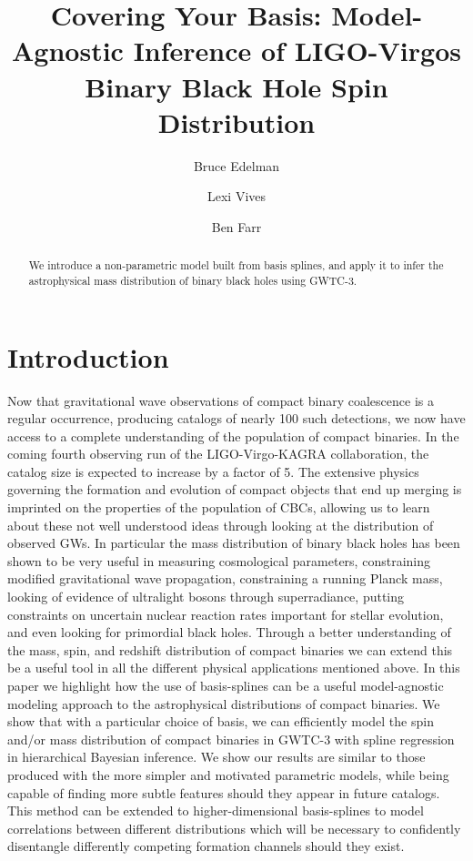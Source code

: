 \documentclass[twocolumn, linenumber]{aastex63}
\begin{document}
\title{Covering Your Basis: Model-Agnostic Inference of LIGO-Virgos Binary Black Hole Spin Distribution}

\author{Bruce Edelman}

\author{Lexi Vives}

\author{Ben Farr}

\begin{abstract}
We introduce a non-parametric model built from basis splines, and apply it to infer the astrophysical mass distribution of 
binary black holes using GWTC-3.
\end{abstract}


\section{Introduction} \label{sec:intro}

Now that gravitational wave observations of compact binary coalescence is a regular occurrence, producing catalogs of nearly 
100 such detections, we now have access to a complete understanding of the population of compact binaries. In the coming fourth 
observing run of the LIGO-Virgo-KAGRA collaboration, the catalog size is expected to increase by a factor of 5. The extensive 
physics governing the formation and evolution of compact objects that end up merging is imprinted on the properties of the population 
of CBCs, allowing us to learn about these not well understood ideas through looking at the distribution of observed GWs. In particular 
the mass distribution of binary black holes has been shown to be very useful in measuring cosmological parameters, constraining modified 
gravitational wave propagation, constraining a running Planck mass, looking of evidence of ultralight bosons through superradiance, 
putting constraints on uncertain nuclear reaction rates important for stellar evolution, and even looking for primordial black holes. 
Through a better understanding of the mass, spin, and redshift distribution of compact binaries we can extend this be a useful tool 
in all the different physical applications mentioned above. In this paper we highlight how the use of basis-splines can be a useful 
model-agnostic modeling approach to the astrophysical distributions of compact binaries. We show that with a particular choice of basis, 
we can efficiently model the spin and/or mass distribution of compact binaries in GWTC-3 with spline regression in hierarchical 
Bayesian inference. We show our results are similar to those produced with the more simpler and motivated parametric models, 
while being capable of finding more subtle features should they appear in future catalogs. This method can be extended to higher-dimensional 
basis-splines to model correlations between different distributions which will be necessary to confidently disentangle differently 
competing formation channels should they exist. 
\end{document}
